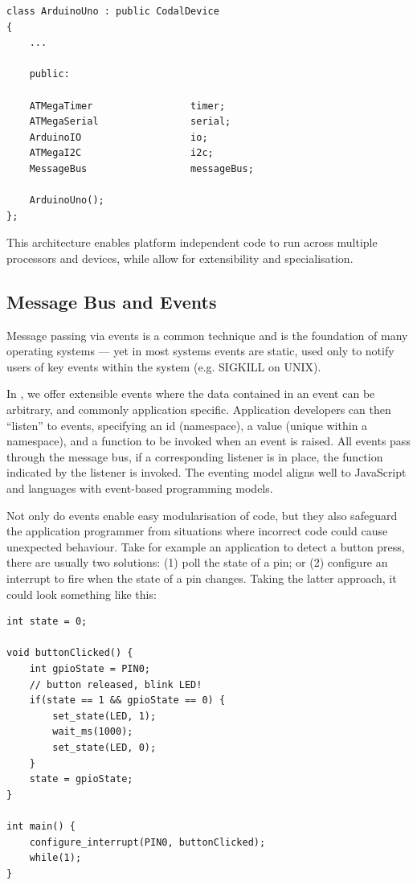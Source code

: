 \begin{lstlisting}
class ArduinoUno : public CodalDevice
{
    ...

    public:

    ATMegaTimer                 timer;
    ATMegaSerial                serial;
    ArduinoIO                   io;
    ATMegaI2C                   i2c;
    MessageBus                  messageBus;

    ArduinoUno();
};
\end{lstlisting}

This architecture enables platform independent code to run across multiple processors and devices, while
allow for extensibility and specialisation.

\subsection{Message Bus and Events}

Message passing via events is a common technique and is the foundation of many operating systems --- yet in most systems events are static, used only to notify users of key events within the system (e.g. SIGKILL on UNIX).

In \CON, we offer extensible events where the data contained in an event can be arbitrary, and commonly application specific. Application developers can then ``listen'' to events, specifying an id (namespace), a value (unique within a namespace), and a function to be invoked when an event is raised. All events pass through the message bus, if a corresponding listener is in place, the function indicated by the listener is invoked. The eventing model aligns well to JavaScript and languages with event-based programming models. 

Not only do events enable easy modularisation of code, but they also safeguard the application programmer from situations where incorrect code could cause unexpected behaviour. Take for example an application to detect a button press, there are usually two solutions: (1) poll the state of a pin; or (2) configure an interrupt to fire when the state of a pin changes. Taking the latter approach, it could look something like this:

\begin{lstlisting}
int state = 0;

void buttonClicked() {
    int gpioState = PIN0;
    // button released, blink LED!
    if(state == 1 && gpioState == 0) {
        set_state(LED, 1);
        wait_ms(1000);
        set_state(LED, 0);
    }
    state = gpioState;
}

int main() {
    configure_interrupt(PIN0, buttonClicked);
    while(1);
}
\end{lstlisting}


